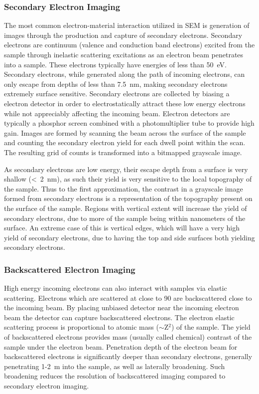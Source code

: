 \subsubsection{Secondary Electron Imaging} The most common electron-material interaction utilized in SEM is generation of images through the production and capture of secondary electrons.
Secondary electrons are continuum (valence and conduction band electrons) excited from the sample through inelastic scattering excitations as an electron beam penetrates into a sample.
These electrons typically have energies of less than 50~eV\cite{goldstein2003scanning}.
Secondary electrons, while generated along the path of incoming electrons, can only escape from depths of less than 7.5~nm, making secondary electrons extremely surface sensitive\cite{goldstein2003scanning}.
Secondary electrons are collected by biasing a electron detector in order to electrostatically attract these low energy electrons while not appreciably affecting the incoming beam.
Electron detectors are typically a phosphor screen combined with a photomultiplier tube to provide high gain.
Images are formed by scanning the beam across the surface of the sample and counting the secondary electron yield for each dwell point within the scan.
The resulting grid of counts is transformed into a bitmapped grayscale image.

As secondary electrons are low energy, their escape depth from a surface is very shallow (<~2~nm), as such their yield is very sensitive to the local topography of the sample.
Thus to the first approximation, the contrast in a grayscale image formed from secondary electrons is a representation of the topography present on the surface of the sample.
Regions with vertical extent will increase the yield of secondary electrons, due to more of the sample being within nanometers of the surface.
An extreme case of this is vertical edges, which will have a very high yield of secondary electrons, due to having the top and side surfaces both yielding secondary electrons.

\subsubsection{Backscattered Electron Imaging} High energy incoming electrons can also interact with samples via elastic scattering.
Electrons which are scattered at close to 90\degree{} are backscattered close to the incoming beam.
By placing unbiased detector near the incoming electron beam the detector can capture backscattered electrons.
The electron elastic scattering process is proportional to atomic mass (\(\sim\)Z\(^2\)) of the sample.
The yield of backscattered electrons provides mass (usually called chemical) contrast of the sample under the electron beam.
Penetration depth of the electron beam for backscattered electrons is significantly deeper than secondary electrons, generally penetrating 1-2~\micro{}m into the sample, as well as laterally broadening.
Such broadening reduces the resolution of backscattered imaging compared to secondary electron imaging.

